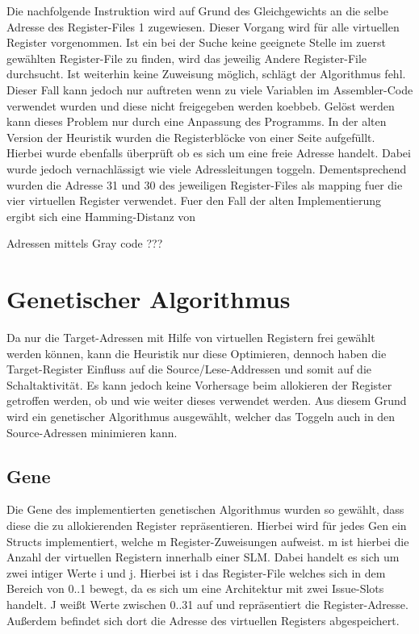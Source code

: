 Die nachfolgende Instruktion wird auf Grund des Gleichgewichts an die selbe Adresse des Register-Files 1 zugewiesen. Dieser Vorgang wird für alle virtuellen Register vorgenommen. Ist ein bei der Suche keine geeignete Stelle im zuerst gewählten Register-File zu finden, wird das jeweilig Andere Register-File durchsucht. Ist weiterhin keine Zuweisung möglich, schlägt der Algorithmus fehl. Dieser Fall kann jedoch nur auftreten wenn zu viele Variablen im Assembler-Code verwendet wurden und diese nicht freigegeben werden koebbeb. Gelöst werden kann dieses Problem nur durch eine Anpassung des Programms.
In der alten Version der Heuristik wurden die Registerblöcke von einer Seite aufgefüllt. Hierbei wurde ebenfalls überprüft ob es sich um eine freie Adresse handelt. Dabei wurde jedoch vernachlässigt wie viele Adressleitungen toggeln. Dementsprechend wurden die Adresse 31 und 30 des jeweiligen Register-Files als mapping fuer die vier virtuellen Register verwendet.
Fuer den Fall der alten Implementierung ergibt sich eine Hamming-Distanz von 

Adressen mittels Gray code ??? 

%	

\section{Genetischer Algorithmus}
\label{sec:genetischerAlgorithmus}
Da nur die Target-Adressen mit Hilfe von virtuellen Registern frei gewählt werden können, kann die Heuristik nur diese Optimieren, dennoch haben die Target-Register Einfluss auf die Source/Lese-Addressen und somit auf die Schaltaktivität. Es kann jedoch keine Vorhersage beim allokieren der Register getroffen werden, ob und wie weiter dieses verwendet werden. Aus diesem Grund wird ein genetischer Algorithmus ausgewählt, welcher das Toggeln auch in den Source-Adressen minimieren kann.

\subsection{Gene}
Die Gene des implementierten genetischen Algorithmus wurden so gewählt, dass diese die zu allokierenden Register repräsentieren. Hierbei wird für jedes Gen ein Structs implementiert, welche m Register-Zuweisungen aufweist. m ist hierbei die Anzahl der virtuellen Registern innerhalb einer SLM. Dabei handelt es sich um zwei intiger Werte i und j. Hierbei ist i das Register-File welches sich in dem Bereich von 0..1 bewegt, da es sich um eine Architektur mit zwei Issue-Slots handelt. J weißt Werte zwischen 0..31 auf und repräsentiert die Register-Adresse. Außerdem befindet sich dort die Adresse des virtuellen Registers abgespeichert.
 
